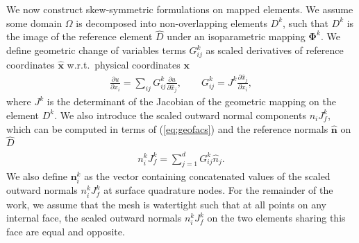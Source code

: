 \documentclass{svjour3}                     %
\renewcommand{\hat}{\widehat}
\newcommand{\pd}[2]{\frac{\partial#1}{\partial#2}}
\begin{document}
We now construct skew-symmetric formulations on mapped elements.  We assume some domain $\Omega$ is decomposed into non-overlapping elements $D^k$, such that $D^k$ is the image of the reference element $\hat{D}$ under an isoparametric mapping $\bm{\Phi}^k$.  We define geometric change of variables terms ${G}^k_{ij}$ as scaled derivatives of reference coordinates $\hat{\bm{x}}$ w.r.t.\ physical coordinates $\bm{x}$
\begin{gather}
\pd{u}{x_i} = \sum_{ij} {G}^k_{ij}\pd{u}{\hat{x}_j}, \qquad {G}^k_{ij} = J^k\pd{\hat{x}_j}{{x}_i}, 
\label{eq:geofacs}
\end{gather}
where $J^k$ is the determinant of the Jacobian of the geometric mapping on the element $D^k$.  We also introduce the scaled outward normal components $n_iJ^k_f$, which can be computed in terms of (\ref{eq:geofacs}) and the reference normals $\hat{\bm{n}}$ on $\hat{D}$
\begin{gather}
n^k_i J^k_f = \sum_{j=1}^d G^k_{ij} \hat{{n}}_j.  
\label{eq:normals}
\end{gather}
We also define $\bm{n}^k_i$ as the vector containing concatenated values of the scaled outward normals $n^k_iJ^k_f$ at surface quadrature nodes.  For the remainder of the work, we assume that the mesh is watertight \cite{chan2018discretely} such that at all points on any internal face, the scaled outward normals $n^k_iJ^k_f$ on the two elements sharing this face are equal and opposite.  

\end{document}

